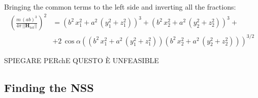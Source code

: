 Bringing the common terms to the left side and inverting all the fractions:
\[
\begin{aligned}
\left( \frac{m \, (a b)^3}{4 \pi \, ||\mathbf{H}_{\text{tot}}||} \right)^2 &= \left( b^2 \, x_1^2 + a^2 \, (y_1^2 + z_1^2) \right)^3 + \left( b^2 \, x_2^2 + a^2 \, (y_2^2 + z_2^2) \right)^3 + \\
& + 2 \, \cos \alpha \left( (b^2 \, x_1^2 + a^2 \, (y_1^2 + z_1^2))(b^2 \, x_2^2 + a^2 \, (y_2^2 + z_2^2)) \right)^{3/2}
\end{aligned}
\]


SPIEGARE PERchE QUESTO È UNFEASIBLE



\subsection{Finding the NSS}
